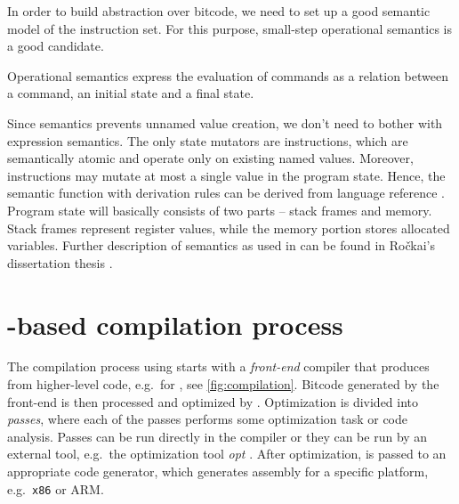 In order to build abstraction over \LLVM bitcode, we need to set up a good
semantic model of the instruction set. For this purpose, small-step operational
semantics \cite{Plotkin04} is a good candidate.

\begin{definition}
Operational semantics express the evaluation of commands as a relation between
a command, an initial state and a final state.
\end{definition}

\noindent
Since \LLVMIR semantics prevents unnamed value creation, we don't need to
bother with expression semantics. The only state mutators are instructions, which are
semantically atomic and operate only on existing named values. Moreover,
instructions may mutate at most a single value in the program state. Hence, the
semantic function with derivation rules can be derived from \LLVM
language reference \cite{LLVM:langref}. Program state will basically
consists of two parts -- stack frames and memory. Stack frames represent
register values, while the memory portion stores allocated variables.
Further description of \LLVM semantics as used in \DIVINE can be found in Ročkai's
dissertation thesis \cite{Rockai15}.

\section{\LLVM-based compilation process} \label{sec:compilation}

The compilation process using \LLVM starts with a \emph{front-end} compiler that produces
\LLVMIR from higher-level code, e.g.~\clang for \Cpp{}, see \autoref{fig:compilation}.
Bitcode generated by the front-end is then processed and optimized by \LLVM.
Optimization is divided into \LLVM \emph{passes}, where each of the passes
performs some optimization task or code analysis. Passes can be run directly
in the compiler or they can be run by an external tool, e.g.~the \LLVM
optimization tool \emph{opt} \cite{LLVM:opt}. After optimization, \LLVMIR is passed to
an appropriate code generator, which generates assembly for a specific
platform, e.g.~\texttt{x86} or ARM.

